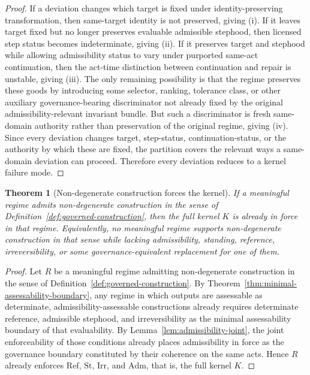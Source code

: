 \documentclass[11pt]{article}
\newtheorem{theorem}{Theorem}[section]
\theoremstyle{definition}
\theoremstyle{remark}
\newcommand{\Adm}{\mathrm{Adm}}
\newcommand{\St}{\mathrm{St}}
\newcommand{\RefK}{\mathrm{Ref}}
\newcommand{\Irr}{\mathrm{Irr}}
\begin{document}
\begin{proof}
If a deviation changes which target is fixed under identity-preserving transformation, then same-target identity is not preserved, giving (i). If it leaves target fixed but no longer preserves evaluable admissible stephood, then licensed step status becomes indeterminate, giving (ii). If it preserves target and stephood while allowing admissibility status to vary under purported same-act continuation, then the act-time distinction between continuation and repair is unstable, giving (iii). The only remaining possibility is that the regime preserves these goods by introducing some selector, ranking, tolerance class, or other auxiliary governance-bearing discriminator not already fixed by the original admissibility-relevant invariant bundle. But such a discriminator is fresh same-domain authority rather than preservation of the original regime, giving (iv). Since every deviation changes target, step-status, continuation-status, or the authority by which these are fixed, the partition covers the relevant ways a same-domain deviation can proceed. Therefore every deviation reduces to a kernel failure mode.
\end{proof}

\begin{theorem}[Non-degenerate construction forces the kernel]\label{thm:construction-forces-kernel}
If a meaningful regime admits non-degenerate construction in the sense of Definition~\ref{def:governed-construction}, then the full kernel $K$ is already in force in that regime. Equivalently, no meaningful regime supports non-degenerate construction in that sense while lacking admissibility, standing, reference, irreversibility, or some governance-equivalent replacement for one of them.
\end{theorem}

\begin{proof}
Let $R$ be a meaningful regime admitting non-degenerate construction in the sense of Definition~\ref{def:governed-construction}. By Theorem~\ref{thm:minimal-assessability-boundary}, any regime in which outputs are assessable as determinate, admissibility-assessable constructions already requires determinate reference, admissible stephood, and irreversibility as the minimal assessability boundary of that evaluability. By Lemma~\ref{lem:admissibility-joint}, the joint enforceability of those conditions already places admissibility in force as the governance boundary constituted by their coherence on the same acts. Hence $R$ already enforces $\RefK$, $\St$, $\Irr$, and $\Adm$, that is, the full kernel $K$.
\end{proof}
\end{document}
